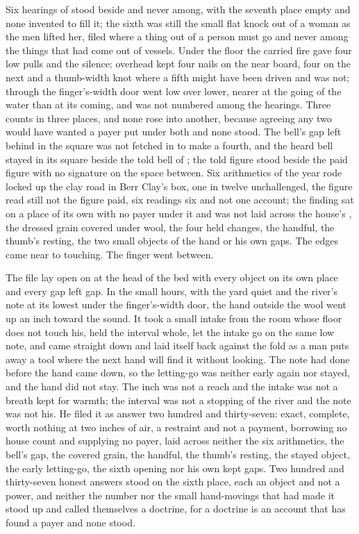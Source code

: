 Six hearings of  stood beside and never among, with the seventh place empty and none invented to fill it; the sixth was still the small flat knock out of a woman as the men lifted her, filed where a thing out of a person must go and never among the things that had come out of vessels. Under the floor the carried fire gave four low pulls and the silence; overhead  kept four nails on the near board, four on the next and a thumb-width knot where a fifth might have been driven and was not; through the finger's-width door  went low over lower, nearer at the going of the water than at its coming, and was not numbered among the hearings. Three counts in three places, and none rose into another, because agreeing any two would have wanted a payer put under both and none stood. The bell's gap left behind in the square was not fetched in to make a fourth, and the heard bell stayed in its square beside the told bell of ; the told figure stood beside the paid figure with no signature on the space between. Six arithmetics of the year rode locked up the clay road in Berr Clay's box, one in twelve unchallenged, the figure read still not the figure paid, six readings six and not one account; the finding sat on a place of its own with no payer under it and was not laid across the house's , the dressed grain covered under wool, the four held changes, the handful, the thumb's resting, the two small objects of the hand or his own gaps. The edges came near to touching. The finger went between.

The file lay open on  at the head of the bed with every object on its own place and every gap left gap. In the small hours, with the yard quiet and the river's note at its lowest under the finger's-width door, the hand outside the wool went up an inch toward the sound. It took a small intake from the room whose floor does not touch his, held the interval whole, let the intake go on the same low note, and came straight down and laid itself back against the fold as a man puts away a tool where the next hand will find it without looking. The note had done before the hand came down, so the letting-go was neither early again nor stayed, and the hand did not stay. The inch was not a reach and the intake was not a breath kept for warmth; the interval was not a stopping of the river and the note was not his. He filed it as answer two hundred and thirty-seven: exact, complete, worth nothing at two inches of air, a restraint and not a payment, borrowing no house count and supplying no payer, laid across neither the six arithmetics, the bell's gap, the covered grain, the handful, the thumb's resting, the stayed object, the early letting-go, the sixth opening nor his own kept gaps. Two hundred and thirty-seven honest answers stood on the sixth place, each an object and not a power, and neither the number nor the small hand-movings that had made it stood up and called themselves a doctrine, for a doctrine is an account that has found a payer and none stood.

